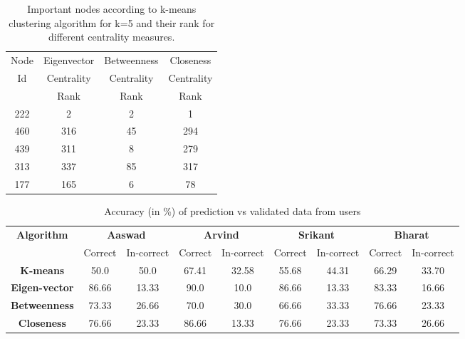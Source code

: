 
\begin{table}[th]
\small
\centering
\begin{tabular}{ |c|c|c|c| }
\hline
Node&	Eigenvector& Betweenness& Closeness\\
Id&	Centrality& Centrality& Centrality\\
&	Rank&	Rank&	Rank\\ \hline
222&	2&	2&	1\\ \hline
460&	316&	45&	294\\ \hline
439&	311&	8&	279\\ \hline
313&	337&	85&	317\\ \hline
177&	165&	6&	78\\ \hline
\end{tabular}
\caption{\capfont Important nodes according to k-means clustering
algorithm for k=5 and their rank for different centrality measures.}
\label{tab:k-means-results}
\end{table}


\begin{table*}[th]
\small
\centering
\begin{tabular}{ c|c|c|c|c|c|c|c|c| }
\hline
\multicolumn{1}{|c|}{\textbf{Algorithm}} &
\multicolumn{2}{c}{\textbf{Aaswad}}&
  \multicolumn{2}{|c|}{\textbf{Arvind}} &
  \multicolumn{2}{|c|}{\textbf{Srikant}} &
  \multicolumn{2}{|c|}{\textbf{Bharat}} \\
  \cline{2-9}
  \multicolumn{1}{|c|}{} &
  Correct & In-correct & Correct & In-correct & Correct & In-correct & Correct & In-correct \\  \hline
    \hline
  \multicolumn{1}{|c|}{\textbf{K-means}}
& 50.0 & 50.0 & 67.41 & 32.58 & 55.68 & 44.31 & 66.29 & 33.70 \\ \hline
  \multicolumn{1}{|c|}{\textbf{Eigen-vector}}
& 86.66 & 13.33 & 90.0 & 10.0 & 86.66 & 13.33 & 83.33 & 16.66 \\ \hline
  \multicolumn{1}{|c|}{\textbf{Betweenness}}
& 73.33 & 26.66 & 70.0 & 30.0 & 66.66 & 33.33 & 76.66 & 23.33\\  \hline
  \multicolumn{1}{|c|}{\textbf{Closeness}}
& 76.66 & 23.33 & 86.66 & 13.33 & 76.66 & 23.33 & 73.33 & 26.66 \\ \hline
\end{tabular}

\caption{\capfont Accuracy (in \%) of prediction vs validated data from users}
\label{tab:accuracy-of-algorithms}
\end{table*}


